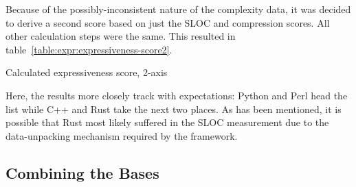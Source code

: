 Because of the possibly-inconsistent nature of the complexity data, it was decided to derive a second score based on just the SLOC and compression scores. All other calculation steps were the same. This resulted in table~\ref{table:expr:expressiveness-score2}.

\begin{table}[!htb]

\caption{Calculated expressiveness score, 2-axis}
\label{table:expr:expressiveness-score2}
\end{table}

Here, the results more closely track with expectations: Python and Perl head the list while C++ and Rust take the next two places. As has been mentioned, it is possible that Rust most likely suffered in the SLOC measurement due to the data-unpacking mechanism required by the framework.

\subsection{Combining the Bases}
\label{subsec:combined}

